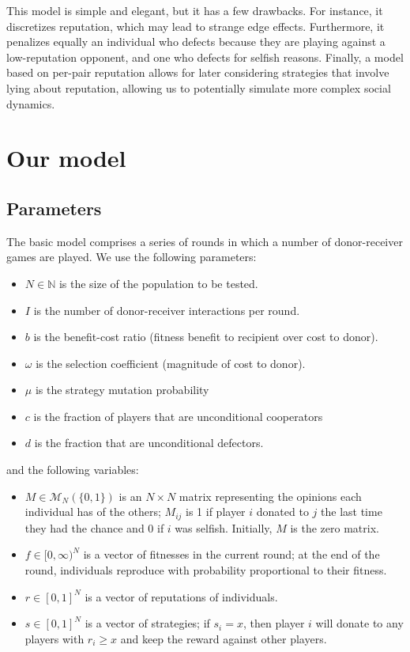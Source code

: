 \documentclass{amsart}
\begin{document}
This model is simple and elegant, but it has a few drawbacks. For instance, it discretizes reputation, which may lead to strange edge effects. Furthermore, it penalizes equally an individual who defects because they are playing against a low-reputation opponent, and one who defects for selfish reasons. Finally, a model based on per-pair reputation allows for later considering strategies that involve lying about reputation, allowing us to potentially simulate more complex social dynamics.

\section{Our model}

\subsection{Parameters}

The basic model comprises a series of rounds in which a number of donor-receiver games are played. We use the following parameters:

\begin{itemize}
\item $N \in \mathbb{N}$ is the size of the population to be tested.
\item $I$ is the number of donor-receiver interactions per round.
\item $b$ is the benefit-cost ratio (fitness benefit to recipient over cost to donor).
\item $\omega$ is the selection coefficient (magnitude of cost to donor).
\item $\mu$ is the strategy mutation probability
\item $c$ is the fraction of players that are unconditional cooperators
\item $d$ is the fraction that are unconditional defectors.
\end{itemize}

and the following variables:
\begin{itemize}
\item $M \in \mathcal{M}_N(\{0,1\})$ is an $N \times N$ matrix representing the opinions each individual has of the others; $M_{ij}$ is 1 if player $i$ donated to $j$ the last time they had the chance and 0 if $i$ was selfish. Initially, $M$ is the zero matrix.
\item $f \in [0, \infty)^N$ is a vector of fitnesses in the current round; at the end of the round, individuals reproduce with probability proportional to their fitness.
\item $r \in [0,1]^N$ is a vector of reputations of individuals.
\item $s \in [0,1]^N$ is a vector of strategies; if $s_i = x$, then player $i$ will donate to any players with $r_i \ge x$ and keep the reward against other players.
\end{itemize}
\end{document}
